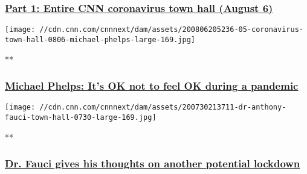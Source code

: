 \hypertarget{part-1-entire-cnn-coronavirus-town-hall-august-6-1}{%
\subsubsection{\texorpdfstring{\href{/videos/health/2020/08/06/entire-august-6-coronavirus-town-hall-part-1-sot-vpx.cnn}{Part
1: Entire CNN coronavirus town hall (August
6)}}{Part 1: Entire CNN coronavirus town hall (August 6)}}\label{part-1-entire-cnn-coronavirus-town-hall-august-6-1}}

\href{/videos/health/2020/08/07/michael-phelps-mental-health-challenges-pandemic-town-hall-vpx.cnn/video/playlists/cnn-coronavirus-town-hall/}{}

\texttt{[image: //cdn.cnn.com/cnnnext/dam/assets/200806205236-05-coronavirus-town-hall-0806-michael-phelps-large-169.jpg]}

**

\hypertarget{michael-phelps-its-ok-not-to-feel-ok-during-a-pandemic}{%
\subsubsection{\texorpdfstring{\href{/videos/health/2020/08/07/michael-phelps-mental-health-challenges-pandemic-town-hall-vpx.cnn/video/playlists/cnn-coronavirus-town-hall/}{Michael
Phelps: It's OK not to feel OK during a
pandemic}}{Michael Phelps: It's OK not to feel OK during a pandemic}}\label{michael-phelps-its-ok-not-to-feel-ok-during-a-pandemic}}

\href{/videos/health/2020/07/31/fauci-another-lockdown-coronavirus-pandemic-curve-impossible-predict-town-hall-bts-vpx.cnn/video/playlists/cnn-coronavirus-town-hall/}{}

\texttt{[image: //cdn.cnn.com/cnnnext/dam/assets/200730213711-dr-anthony-fauci-town-hall-0730-large-169.jpg]}

**

\hypertarget{dr-fauci-gives-his-thoughts-on-another-potential-lockdown}{%
\subsubsection{\texorpdfstring{\href{/videos/health/2020/07/31/fauci-another-lockdown-coronavirus-pandemic-curve-impossible-predict-town-hall-bts-vpx.cnn/video/playlists/cnn-coronavirus-town-hall/}{Dr.
Fauci gives his thoughts on another potential
lockdown}}{Dr. Fauci gives his thoughts on another potential lockdown}}\label{dr-fauci-gives-his-thoughts-on-another-potential-lockdown}}

